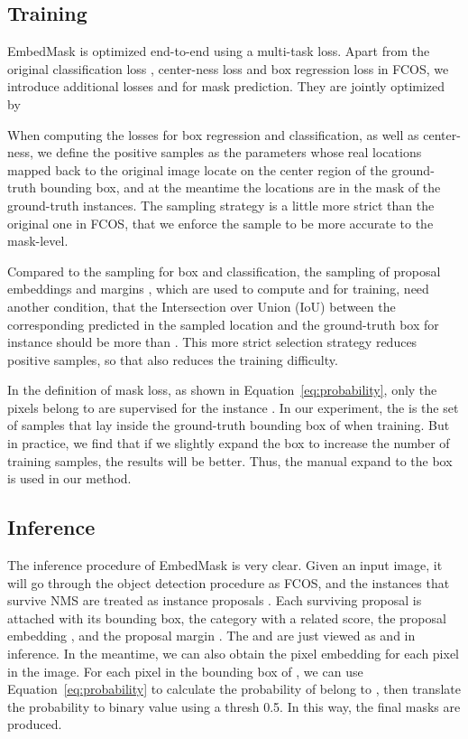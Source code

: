 \documentclass[10pt,twocolumn,letterpaper]{article}
\begin{document}
\subsection{Training} \label{sec:training}

\medbreak
{} 
EmbedMask is optimized end-to-end using a multi-task loss. Apart from the original classification loss , center-ness loss  and box regression loss  in FCOS, we introduce additional losses  and  for mask prediction. 
They are jointly optimized by 



\medbreak
{}
When computing the losses for box regression and classification, as well as center-ness, we define the positive samples as the parameters  whose real locations mapped back to the original image locate on the center region of the ground-truth bounding box, and at the meantime the locations are in the mask of the ground-truth instances. 
The sampling strategy is a little more strict than the original one in FCOS, that we enforce the sample to be more accurate to the mask-level.

\medbreak
{}
Compared to the sampling for box and classification, the sampling of proposal embeddings  and margins , which are used to compute  and  for training, need another condition, that the Intersection over Union (IoU) between the corresponding predicted  in the sampled location and the ground-truth box for instance  should be more than . 
This more strict selection strategy reduces positive samples, so that also reduces the training difficulty.

In the definition of mask loss, as shown in Equation~\ref{eq:probability}, only the pixels belong to  are supervised for the instance . 
In our experiment, the  is the set of samples that lay inside the ground-truth bounding box of  when training. 
But in practice, we find that if we slightly expand the box to increase the number of training samples, the results will be better. 
Thus, the manual expand to the box is used in our method.

\subsection{Inference} 
The inference procedure of EmbedMask is very clear. 
Given an input image, it will go through the object detection procedure as FCOS, and the instances that survive NMS are treated as instance proposals . 
Each surviving proposal  is attached with its bounding box, the category with a related score, the proposal embedding , and the proposal margin . 
The  and  are just viewed as  and  in inference. 
In the meantime, we can also obtain the pixel embedding  for each pixel  in the image. 
For each pixel  in the bounding box of , we can use Equation~\ref{eq:probability} to calculate the probability of  belong to , then translate the probability to binary value using a thresh 0.5. In this way, the final masks are produced. 
\end{document}
